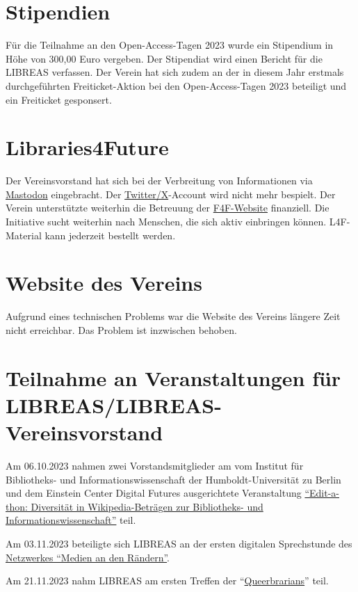 \documentclass[a4paper,
fontsize=11pt,
oneside,
numbers=noperiodatend,
parskip=half-,
bibliography=totoc,
final
]{scrartcl}
\begin{document}
\hypertarget{stipendien}{%
\section{Stipendien}\label{stipendien}}

Für die Teilnahme an den Open-Access-Tagen 2023 wurde ein Stipendium in
Höhe von 300,00 Euro vergeben. Der Stipendiat wird einen Bericht für die
LIBREAS verfassen. Der Verein hat sich zudem an der in diesem Jahr
erstmals durchgeführten Freiticket-Aktion bei den Open-Access-Tagen 2023
beteiligt und ein Freiticket gesponsert.

\hypertarget{libraries4future}{%
\section{Libraries4Future}\label{libraries4future}}

Der Vereinsvorstand hat sich bei der Verbreitung von Informationen via
\href{https://climatejustice.global/@libraries4future}{Mastodon}
eingebracht. Der
\href{https://twitter.com/Libraries4F}{Twitter/X}-Account wird nicht
mehr bespielt. Der Verein unterstützte weiterhin die Betreuung der
\href{https://libraries4future.org/}{F4F-Website} finanziell. Die
Initiative sucht weiterhin nach Menschen, die sich aktiv einbringen
können. L4F-Material kann jederzeit bestellt werden.

\hypertarget{website-des-vereins}{%
\section{Website des Vereins}\label{website-des-vereins}}

Aufgrund eines technischen Problems war die Website des Vereins längere
Zeit nicht erreichbar. Das Problem ist inzwischen behoben.

\hypertarget{teilnahme-an-veranstaltungen-fuxfcr-libreaslibreas-vereinsvorstand}{%
\section{Teilnahme an Veranstaltungen für
LIBREAS/LIBREAS-Vereinsvorstand}\label{teilnahme-an-veranstaltungen-fuxfcr-libreaslibreas-vereinsvorstand}}

Am 06.10.2023 nahmen zwei Vorstandsmitglieder am vom Institut für
Bibliotheks- und Informationswissenschaft der Humboldt-Universität zu
Berlin und dem Einstein Center Digital Futures ausgerichtete
Veranstaltung
\href{https://www.digital-future.berlin/aktuelles/aktuelles-im-detail/news/recap-edit-a-thon-fuer-mehr-diversitaet-in-der-wikipedia1/?tx_news_pi1\%5Bcontroller\%5D=News\&tx_news_pi1\%5Baction\%5D=detail\&cHash=0b82716e054f4337bb13e5e04b7ce765}{\enquote{Edit-a-thon:
Diversität in Wikipedia-Beträgen zur Bibliotheks- und
Informationswissenschaft}} teil.

Am 03.11.2023 beteiligte sich LIBREAS an der ersten digitalen
Sprechstunde des
\href{https://www.bib-info.de/berufspraxis/medien-an-den-raendern}{Netzwerkes
\enquote{Medien an den Rändern}}.

Am 21.11.2023 nahm LIBREAS am ersten Treffen der
\enquote{\href{https://chaos.social/@fuzzyleapfrog/111362578487652002}{Queerbrarians}}
teil.

\end{document}
